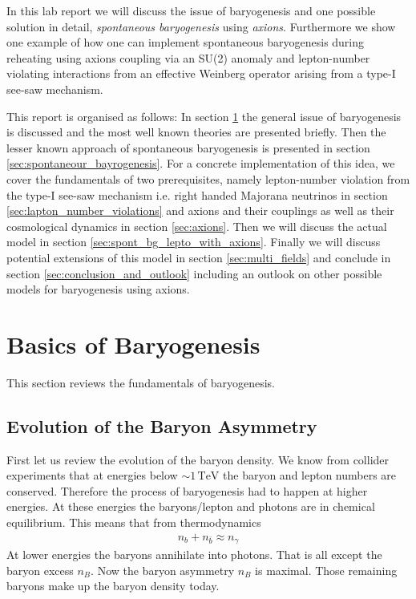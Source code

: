 \documentclass[13pt,a4paper,twoside,titlepage]{article}
\begin{document}
\noindent
In this lab report we will discuss the issue of baryogenesis and one possible solution in detail, \emph{spontaneous baryogenesis} using \emph{axions}. Furthermore we show one example of how one can implement spontaneous baryogenesis during reheating using axions coupling via an SU(2) anomaly and lepton-number violating interactions from an effective Weinberg operator arising from a type-I see-saw mechanism.

\noindent
This report is organised as follows:
In section \ref{sec:baryogenesis} the general issue of baryogenesis is discussed and the most well known theories are presented briefly.
Then the lesser known approach of spontaneous baryogenesis is presented in section \ref{sec:spontaneour_bayrogenesis}.
For a concrete implementation of this idea, we cover the fundamentals of two prerequisites, namely lepton-number violation from the type-I see-saw mechanism i.e. right handed Majorana neutrinos in section \ref{sec:lapton_number_violations} and axions and their couplings as well as their cosmological dynamics in section \ref{sec:axions}. Then we will discuss the actual model in section \ref{sec:spont_bg_lepto_with_axions}.
Finally we will discuss potential extensions of this model in section \ref{sec:multi_fields} and conclude in section \ref{sec:conclusion_and_outlook} including an outlook on other possible models for baryogenesis using axions.

\section{Basics of Baryogenesis}
\label{sec:baryogenesis}

This section reviews the fundamentals of baryogenesis.

\subsection{Evolution of the Baryon Asymmetry}
First let us review the evolution of the baryon density. We know from collider experiments that at energies below $\sim 1 \, \mathrm{TeV}$ the baryon and lepton numbers are conserved.
Therefore the process of baryogenesis had to happen at higher energies.
At these energies the baryons/lepton and photons are in chemical equilibrium.
This means that from thermodynamics
\begin{align}
\label{eq:baryon_equilibrium}
n_b + n_{\bar{b}} \approx n_\gamma
\end{align}
At lower energies the baryons annihilate into photons. That is all except the baryon excess $n_B$. Now the baryon asymmetry $n_B$ is maximal. Those remaining baryons make up the baryon density today.
\end{document}
